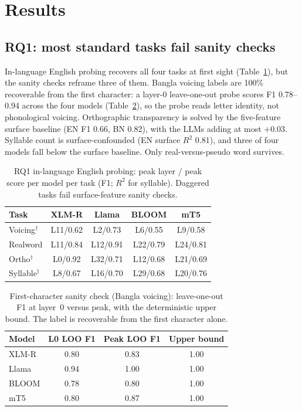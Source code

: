 \documentclass[conference]{IEEEtran}
\begin{document}
\section{Results}
\subsection{RQ1: most standard tasks fail sanity checks}
In-language English probing recovers all four tasks at first sight (Table~\ref{tab:rq1}), but the sanity checks reframe three of them. Bangla voicing labels are 100\% recoverable from the first character: a layer-0 leave-one-out probe scores F1 0.78--0.94 across the four models (Table~\ref{tab:sanity}), so the probe reads letter identity, not phonological voicing. Orthographic transparency is solved by the five-feature surface baseline (EN F1 0.66, BN 0.82), with the LLMs adding at most $+0.03$. Syllable count is surface-confounded (EN surface $R^2$ 0.81), and three of four models fall below the surface baseline. Only real-versus-pseudo word survives.

\begin{table}[t]
\caption{RQ1 in-language English probing: peak layer / peak score per model per task (F1; $R^2$ for syllable). Daggered tasks fail surface-feature sanity checks.}
\label{tab:rq1}
\centering
\small
\setlength{\tabcolsep}{4pt}
\begin{tabular}{lcccc}
\toprule
\textbf{Task} & \textbf{XLM-R} & \textbf{Llama} & \textbf{BLOOM} & \textbf{mT5} \\
\midrule
Voicing$^\dagger$    & L11/0.62 & L2/0.73  & L6/0.55  & L9/0.58  \\
Realword             & L11/0.84 & L12/0.91 & L22/0.79 & L24/0.81 \\
Ortho$^\dagger$      & L0/0.92  & L32/0.71 & L12/0.68 & L21/0.69 \\
Syllable$^\dagger$   & L8/0.67  & L16/0.70 & L29/0.68 & L20/0.76 \\
\bottomrule
\end{tabular}
\end{table}

\begin{table}[t]
\caption{First-character sanity check (Bangla voicing): leave-one-out F1 at layer~0 versus peak, with the deterministic upper bound. The label is recoverable from the first character alone.}
\label{tab:sanity}
\centering
\small
\setlength{\tabcolsep}{5pt}
\begin{tabular}{lccc}
\toprule
\textbf{Model} & \textbf{L0 LOO F1} & \textbf{Peak LOO F1} & \textbf{Upper bound} \\
\midrule
XLM-R & 0.80 & 0.83 & 1.00 \\
Llama & 0.94 & 1.00 & 1.00 \\
BLOOM & 0.78 & 0.80 & 1.00 \\
mT5   & 0.80 & 0.87 & 1.00 \\
\bottomrule
\end{tabular}
\end{table}
\end{document}
